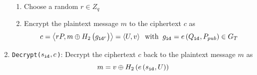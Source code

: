 \begin{algorithm}
\begin{enumerate}
\begin{enumerate}
    \item Choose a random $r \in Z_q$
    \item Encrypt the plaintext message $m$ to the ciphertext $c$ as
    \begin{equation*}
     c = \left< rP, m \oplus H_2 \left( g_{\mathtt{id}_{}^r} \right) \right> = \left< U, v \right> \; \; \textrm{with} \; \; g_{\mathtt{id}_{}} = e \left( Q_{\mathtt{id}_{}}, P_{pub} \right) \in G_T
    \end{equation*}
   \end{enumerate}
   \item \texttt{Decrypt($s_{\mathtt{id}_{}}, c$)}: Decrypt the ciphertext $c$ back to the plaintext message $m$ as
   \begin{equation*}
    m = v \oplus H_2 \left( e \left( s_{\mathtt{id}_{}}, U \right) \right)
   \end{equation*}
 \end{enumerate}
\end{algorithm}

